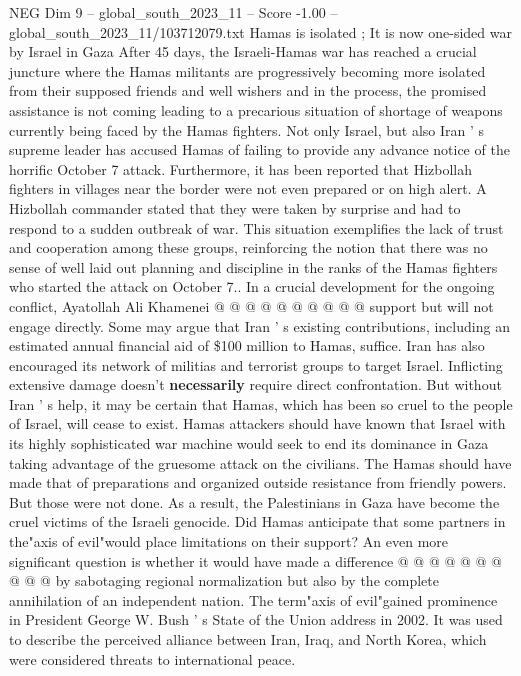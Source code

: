 \begin{textsample}{NEG Dim 9 – global\_south\_2023\_11 – Score -1.00 – global\_south\_2023\_11/103712079.txt}  \label{ex:f9_neg_431}
Hamas is isolated ; It is now one-sided war by Israel in Gaza After 45 days, the Israeli-Hamas war has reached a crucial juncture where the Hamas militants are progressively becoming more isolated from their supposed friends and well wishers and in the process, the promised assistance is not coming leading to a precarious situation of shortage of weapons currently being faced by the Hamas fighters.
Not only Israel, but also Iran ' s supreme leader has accused Hamas of failing to provide any advance notice of the horrific October 7 attack.
Furthermore, it has been reported that Hizbollah fighters in villages near the border were not even prepared or on high alert.
A Hizbollah commander stated that they were taken by surprise and had to respond to a sudden outbreak of war.
This situation exemplifies the lack of trust and cooperation among these groups, reinforcing the notion that there was no sense of well laid out planning and discipline in the ranks of the Hamas fighters who started the attack on October 7..
In a crucial development for the ongoing conflict, Ayatollah Ali Khamenei @ @ @ @ @ @ @ @ @ @ support but will not engage directly.
Some may argue that Iran ' s existing contributions, including an estimated annual financial aid of \$100 million to Hamas, suffice.
Iran has also encouraged its network of militias and terrorist groups to target Israel.
Inflicting extensive damage doesn't \textbf{necessarily} require direct confrontation.
But without Iran ' s help, it may be certain that Hamas, which has been so cruel to the people of Israel, will cease to exist.
Hamas attackers should have known that Israel with its highly sophisticated war machine would seek to end its dominance in Gaza taking advantage of the gruesome attack on the civilians.
The Hamas should have made that of preparations and organized outside resistance from friendly powers.
But those were not done.
As a result, the Palestinians in Gaza have become the cruel victims of the Israeli genocide.
Did Hamas anticipate that some partners in the"axis of evil"would place limitations on their support?
An even more significant question is whether it would have made a difference @ @ @ @ @ @ @ @ @ @ by sabotaging regional normalization but also by the complete annihilation of an independent nation.
The term"axis of evil"gained prominence in President George W.
Bush ' s State of the Union address in 2002.
It was used to describe the perceived alliance between Iran, Iraq, and North Korea, which were considered threats to international peace.

\end{textsample}
